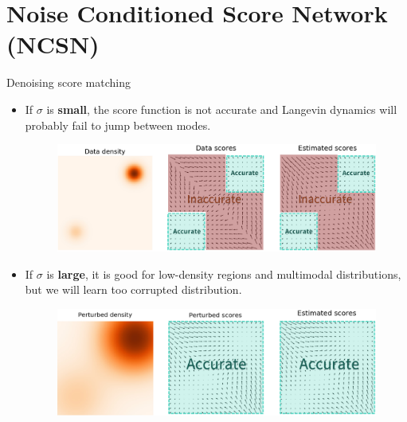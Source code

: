 \section{Noise Conditioned Score Network (NCSN)}
\begin{frame}{Denoising score matching}
	\begin{itemize}
		\item If $\sigma$ is \textbf{small}, the score function is not accurate and Langevin dynamics will probably fail to jump between modes.
		\begin{figure}
			\includegraphics[width=0.75\linewidth]{figs/pitfalls}
		\end{figure}
		\item If $\sigma$ is \textbf{large}, it is good for low-density regions and  multimodal distributions, but we will learn too corrupted distribution.
		\begin{figure}
			\includegraphics[width=0.75\linewidth]{figs/single_noise}
		\end{figure}
	\end{itemize}
\end{frame}
